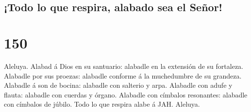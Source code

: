 \hypertarget{todo-lo-que-respira-alabado-sea-el-seuxf1or}{%
\subsection{¡Todo lo que respira, alabado sea el
Señor!}\label{todo-lo-que-respira-alabado-sea-el-seuxf1or}}

\hypertarget{section-149}{%
\section{150}\label{section-149}}

 Aleluya. Alabad á Dios en su santuario: alabadle en la
extensión de su fortaleza.  Alabadle por sus proezas:
alabadle conforme á la muchedumbre de su grandeza.  Alabadle
á son de bocina: alabadle con salterio y arpa.  Alabadle con
adufe y flauta: alabadle con cuerdas y órgano.  Alabadle con
címbalos resonantes: alabadle con címbalos de júbilo.  Todo
lo que respira alabe á JAH. Aleluya.
